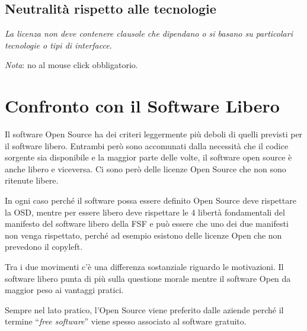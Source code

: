 \subsection{Neutralità rispetto alle tecnologie}

\begin{center}

\textit{La licenza non deve contenere clausole che dipendano o si basano su particolari tecnologie o tipi di interfacce.}

\end{center}

\textit{Nota}: no al mouse click obbligatorio.

\section{Confronto con il Software Libero}

Il software Open Source ha dei criteri leggermente più deboli di quelli previsti per il software libero. Entrambi però sono accomunati dalla necessità che il codice sorgente sia disponibile e la maggior parte delle volte, il software open source è anche libero e viceversa.
Ci sono però delle licenze Open Source che non sono ritenute libere.

In ogni caso perché il software possa essere definito Open Source deve rispettare la OSD, mentre per essere libero deve rispettare le 4 libertà fondamentali del manifesto del software libero della FSF e può essere che uno dei due manifesti non venga rispettato, perché ad esempio esistono delle licenze Open che non prevedono il copyleft.

Tra i due movimenti c'è una differenza sostanziale riguardo le motivazioni. Il software libero punta di più sulla questione morale mentre il software Open da maggior peso ai vantaggi pratici.

Sempre nel lato pratico, l'Open Source viene preferito dalle aziende perché il termine ``\textit{free software}'' viene spesso associato al software gratuito.

